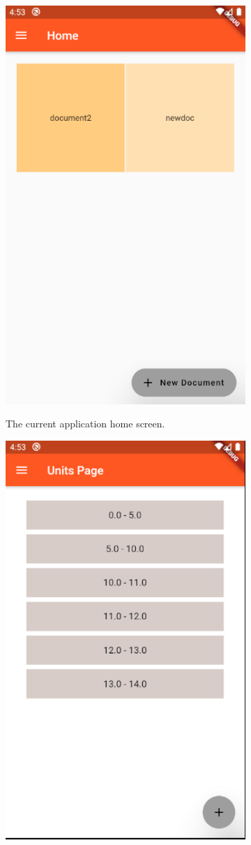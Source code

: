 \documentclass[onecolumn, draftclsnofoot,10pt, compsoc]{IEEEtran}
\begin{document}
\begin{figure}
\begin{subfigure}{.5\textwidth}
    \includegraphics[scale=0.5]{Images/home.png}
    \label{Fig 9.}
    \caption{ The current application home screen.}
\end{subfigure}
\begin{subfigure}{.5\textwidth}
    \includegraphics[scale=0.5]{Images/units_landing.png}

\end{subfigure}
\end{figure}
\end{document}
